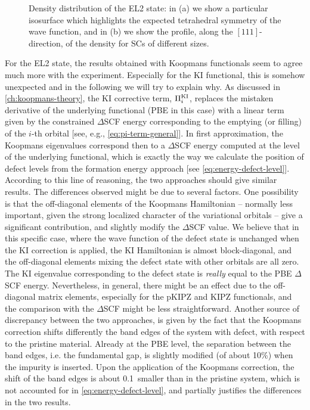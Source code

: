 \begin{figure}
    \centering
     \qquad
    \caption[]{Density distribution of the EL2 state: in (a) we show a particular isosurface which highlights the expected tetrahedral symmetry of the wave function, and in (b) we show the profile, along the $[111]$-direction, of the density for SCs of different sizes.}
    \label{fig:extension-defect-state}
\end{figure}

For the EL2 state, the results obtained with Koopmans functionals seem to agree much more with the experiment. Especially for the KI functional, this is somehow unexpected and in the following we will try to explain why. As discussed in \cref{ch:koopmans-theory}, the KI corrective term, $\Pi_i^{\rm KI}$, replaces the mistaken derivative of the underlying functional (PBE in this case) with a linear term given by the constrained $\Delta$SCF energy corresponding to the emptying (or filling) of the $i$-th orbital [see, e.g., \cref{eq:pi-term-general}]. In first approximation, the Koopmans eigenvalues correspond then to a $\Delta$SCF energy computed at the level of the underlying functional, which is exactly the way we calculate the position of defect levels from the formation energy approach [see \cref{eq:energy-defect-level}]. According to this line of reasoning, the two approaches should give similar results. The differences observed might be due to several factors. One possibility is that the off-diagonal elements of the Koopmans Hamiltonian -- normally less important, given the strong localized character of the variational orbitals -- give a significant contribution, and slightly modify the $\Delta$SCF value. We believe that in this specific case, where the wave function of the defect state is unchanged when the KI correction is applied, the KI Hamiltonian is almost block-diagonal, and the off-diagonal elements mixing the defect state with other orbitals are all zero. The KI eigenvalue corresponding to the defect state is \emph{really} equal to the PBE $\Delta$SCF energy. Nevertheless, in general, there might be an effect due to the off-diagonal matrix elements, especially for the pKIPZ and KIPZ functionals, and the comparison with the $\Delta$SCF might be less straightforward. Another source of discrepancy between the two approaches, is given by the fact that the Koopmans correction shifts differently the band edges of the system with defect, with respect to the pristine material. Already at the PBE level, the separation between the band edges, i.e. the fundamental gap, is slightly modified (of about 10\%) when the impurity is inserted. Upon the application of the Koopmans correction, the shift of the band edges is about 0.1~\ev smaller than in the pristine system, which is not accounted for in \cref{eq:energy-defect-level}, and partially justifies the differences in the two results.


